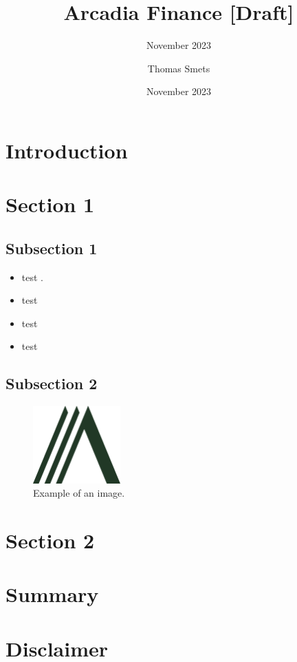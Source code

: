 \documentclass[sigconf,nonacm]{acmart}
\title{Arcadia Finance [Draft]}
\subtitle{November 2023}
\date{November 2023}
\author{Thomas Smets}
\affiliation{
    \institution{Arcadia Finance}
    \city{Brussels}
    \country{Belgium}
}
\begin{document}
\begin{abstract}
    \lipsum[1]
\end{abstract}


\maketitle

\section{Introduction} 
\label{sec:introduction}

\lipsum[2]


\section{Section 1} 
\label{sec:section1}

\lipsum[3]

\subsection{Subsection 1} 
\label{subsec:subsection1}

\lipsum[4]

\begin{itemize}
\item test \cite{Buterin2021}.
\item test
\item test
\item test
\end{itemize}


\subsection{Subsection 2} 
\label{subsec:subsection2}

\lipsum[5]

\begin{figure}
    \label{fig:arcadia-logo}
    \centering
    \includegraphics[width=0.3\textwidth]{images/Logo-Arcadia.png}
    \caption{Example of an image.}
  \end{figure}

\section{Section 2} 
\label{sec:section2}

\lipsum[6]


\section{Summary}
\lipsum[7]




\section*{Disclaimer}
\lipsum[8]
\end{document}
